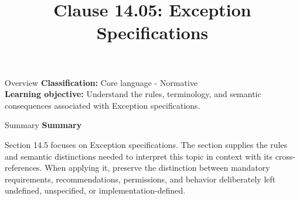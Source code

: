 \documentclass[10pt,letterpaper]{article}
\title{Clause 14.05: Exception Specifications}
\author{}
\date{}
\begin{document}
\maketitle
\begin{CornellOverviewBox}{Overview}
\textbf{Classification:} Core language - Normative\\[2pt]
\textbf{Learning objective:} Understand the rules, terminology, and semantic consequences associated with Exception specifications.
\end{CornellOverviewBox}\begin{CornellSummaryBox}{Summary}
{\sffamily\bfseries\color{Accent} Summary}\par\vspace{3pt}Section 14.5 focuses on Exception specifications. The section supplies the rules and semantic distinctions needed to interpret this topic in context with its cross-references. When applying it, preserve the distinction between mandatory requirements, recommendations, permissions, and behavior deliberately left undefined, unspecified, or implementation-defined.
\end{CornellSummaryBox}
\end{document}
